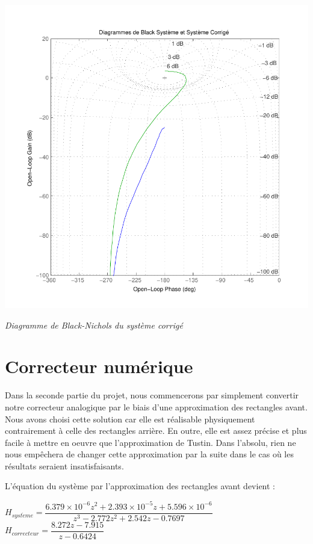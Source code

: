 \documentclass[11pt, french]{article} %
\begin{document}
\begin{center}
\includegraphics[scale=1]{MatBlackFredValues.pdf}

\emph{Diagramme de Black-Nichols du système corrigé}
\end{center}

\section{Correcteur numérique}

Dans la seconde partie du projet, nous commencerons par simplement convertir notre correcteur analogique par le biais d'une approximation des rectangles avant. Nous avons choisi cette solution car elle est réalisable physiquement contrairement à celle des rectangles arrière. En outre, elle est assez précise et plus facile à mettre en oeuvre que l'approximation de Tustin. Dans l'absolu, rien ne nous empêchera de changer cette approximation par la suite dans le cas où les résultats seraient insatisfaisants. 



L'équation du système par l'approximation des rectangles avant devient :
\medskip


\begin{footnotesize}
\begin{center}
$ H_{syst\grave{e}me} = \dfrac{6.379 \times 10^{-6}z^{2} + 2.393 \times 10^{-5}z + 5.596 \times 10^{-6}} {z^{3} - 2.772z^{2} + 2.542z - 0.7697} $
\hspace{2cm}
$  H_{correcteur} = \dfrac {8.272z - 7.915} {z - 0.6424} $
\end{center}
\end{footnotesize}
\end{document}
